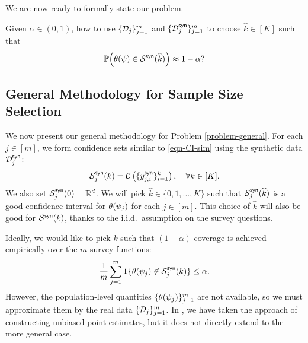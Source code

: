 We are now ready to formally state our problem.

\begin{problem}\label{problem-general}
Given $\alpha \in (0,1)$, how to use $\{ \mathcal{D}_j \}_{j=1}^m$ and $\{ \mathcal{D}^{\mathsf{syn}}_j \}_{j=1}^m$ to choose $\widehat{k}\in[K]$ such that
\[
\mathbb{P} \Big( \theta ( \psi ) \in {\mathcal{S}}^{\mathsf{syn}}(\widehat{k}) \Big) \approx 1-\alpha?
\]
\end{problem}


\subsection{General Methodology for Sample Size Selection}

We now present our general methodology for Problem \ref{problem-general}. For each $j\in[m]$, we form confidence sets similar to \eqref{eqn-CI-sim} using the synthetic data $\mathcal{D}^{\mathsf{syn}}_j$:
\begin{equation}\label{eqn-CI-sim-calibrate}
{\mathcal{S}}^{\mathsf{syn}}_j(k) = \mathcal{C} \left( \{ y^{\mathsf{syn}}_{j,i} \}_{i=1}^k \right),\quad \forall k\in[K].
\end{equation}
We also set ${\mathcal{S}}^{\mathsf{syn}}_j(0) = \mathbb{R}^d$. We will pick $\widehat{k}\in\{0,1,...,K\}$ such that ${\mathcal{S}}^{\mathsf{syn}}_j(\widehat{k})$ is a good confidence interval for $\theta (\psi_j)$ for each $j\in[m]$. This choice of $\widehat{k}$ will also be good for ${\mathcal{S}}^{\mathsf{syn}}(k)$, thanks to the i.i.d.~assumption on the survey questions.

Ideally, we would like to pick $k$ such that $(1-\alpha)$ coverage is achieved empirically over the $m$ survey functions:
\begin{equation}\label{eqn-oracle-criterion}
\frac{1}{m} \sum_{j=1}^m \operatorname{\mathbf{1}} \{  \theta( \psi_j )  \not\in {\mathcal{S}}^{\mathsf{syn}}_j(k) \} \le \alpha.
\end{equation}
However, the population-level quantities $\{ \theta( \psi_j ) \}_{j=1}^m$ are not available, so we must approximate them by the real data $\{ \mathcal{D}_j \}_{j=1}^m$. In , we have taken the approach of constructing unbiased point estimates, but it does not directly extend to the more general case. 

